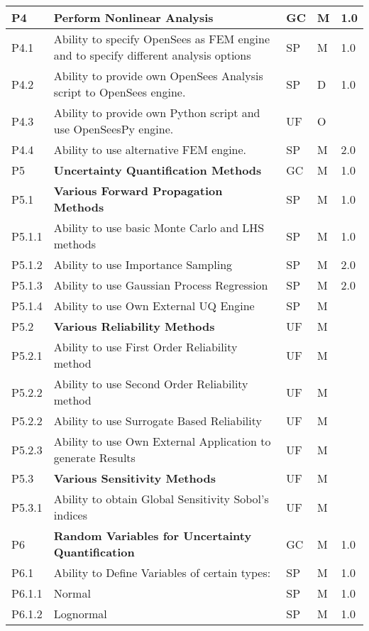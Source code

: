 \begin{longtable}{| p{} | p{} | p{} | p{} |  p{} |}
  
  P4 & \textbf{Perform Nonlinear Analysis} & GC & M & 1.0 \\ \hline
  P4.1 & Ability to specify OpenSees as FEM engine and to specify different analysis options & SP & M & 1.0 \\ \hline
  P4.2 & Ability to provide own OpenSees Analysis script to OpenSees engine. & SP & D & 1.0 \\ \hline
  P4.3 & Ability to provide own Python script and use OpenSeesPy engine. & UF & O &  \\ \hline
  P4.4 & Ability to use alternative FEM engine. & SP & M & 2.0 \\ \hline
  P5 & \textbf{Uncertainty Quantification Methods} &  GC & M & 1.0  \\ \hline
  P5.1 & \textbf{Various Forward Propagation Methods} & SP & M & 1.0  \\ \hline
  P5.1.1 & Ability to use basic  Monte Carlo and LHS methods & SP & M & 1.0 \\ \hline
  P5.1.2 & Ability to use Importance Sampling  & SP & M & 2.0 \\ \hline
  P5.1.3 & Ability to use Gaussian Process Regression & SP & M & 2.0 \\ \hline
  P5.1.4 & Ability to use Own External UQ Engine & SP & M &  \\ \hline
  P5.2 & \textbf{Various Reliability Methods} & UF & M &  \\ \hline
  P5.2.1 & Ability to use First Order Reliability method & UF & M &  \\ \hline
  P5.2.2 & Ability to use Second Order Reliability method & UF & M & \\ \hline
  P5.2.2 & Ability to use Surrogate Based Reliability & UF & M & \\ \hline
  P5.2.3 & Ability to use Own External Application to generate Results & UF & M &  \\ \hline
  P5.3 & \textbf{Various Sensitivity Methods} & UF & M &  \\ \hline
  P5.3.1 & Ability to obtain Global Sensitivity Sobol's indices & UF & M &  \\ \hline
   P6 & \textbf{Random Variables for Uncertainty Quantification} & GC & M & 1.0  \\ \hline
   P6.1 & Ability to Define Variables of certain types: & SP & M & 1.0  \\ 
   P6.1.1 & Normal & SP & M  & 1.0 \\ \hline
    P6.1.2 & Lognormal & SP & M & 1.0 \\ \hline

\end{longtable}
